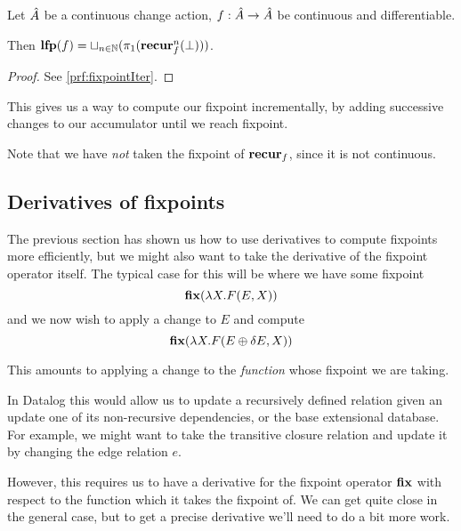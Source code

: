\begin{thm}[name=Incremental computation of least fixpoints, restate=fixpointIter]
\label{thm:fixpointIter}
  Let $\hat{A}$ be a continuous change action, $f: \hat{A} \rightarrow
  \hat{A}$ be continuous and differentiable.

  Then $\mathbf{lfp}(f) = \sqcup_{n \in \mathbb{N}}(\pi_1(\mathbf{recur}_f^n(\bot)))$.
\end{thm}
\ifproofs
\begin{proof}
  See \cref{prf:fixpointIter}.
\end{proof}
\fi

This gives us a way to compute our fixpoint incrementally, by adding successive
changes to our accumulator until we reach fixpoint.

Note that we have \emph{not} taken the fixpoint of $\mathbf{recur}_f$, since it is
not continuous. 

\subsection{Derivatives of fixpoints}
\label{sec:fixpointDerivatives}

The previous section has shown us how to use derivatives to compute fixpoints
more efficiently, but we might also want to take the derivative of the fixpoint
operator itself. The typical case for this will be where we have some fixpoint
\begin{displaymath}
  \mathbf{fix} (\lambda X . F(E, X))
\end{displaymath}
and we now wish to apply a change to $E$ and compute
\begin{displaymath}
  \mathbf{fix} (\lambda X . F(E \oplus \delta E, X))
\end{displaymath}

This amounts to applying a change to the \emph{function} whose fixpoint we are taking.

In Datalog this would allow us to update a recursively defined relation given an
update one of its non-recursive dependencies, or the base extensional database.
For example, we might want to take the transitive closure relation
and update it by changing the edge relation $e$.

However, this requires us to have a derivative for the fixpoint operator
$\mathbf{fix}$ with respect to the function which it takes the fixpoint of.
We can get quite close in the general case, but to get a precise
derivative we'll need to do a bit more work.


